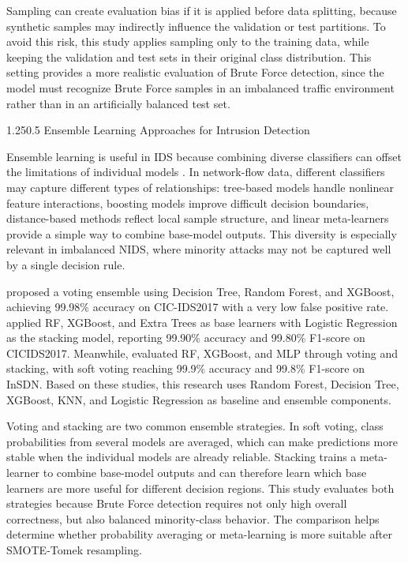 \documentclass[12pt,a4paper]{article}
\makeatletter
\renewcommand{\subsection}{\@startsection{subsection}{2}{0pt}%
  {1.25\baselineskip}{0.5\baselineskip}%
  {\normalfont\fontsize{13}{15.6}\selectfont\bfseries}}
\makeatother
\begin{document}
Sampling can create evaluation bias if it is applied before data splitting, because synthetic samples may indirectly influence the validation or test partitions. To avoid this risk, this study applies sampling only to the training data, while keeping the validation and test sets in their original class distribution. This setting provides a more realistic evaluation of Brute Force detection, since the model must recognize Brute Force samples in an imbalanced traffic environment rather than in an artificially balanced test set.


\subsection{Ensemble Learning Approaches for Intrusion Detection}

Ensemble learning is useful in IDS because combining diverse classifiers can offset the limitations of individual models \parencite{emanet2023voting,pramanick2025stacking,wardana2024collaborative,gu2025semisupervised,alsubaei2025smart}. In network-flow data, different classifiers may capture different types of relationships: tree-based models handle nonlinear feature interactions, boosting models improve difficult decision boundaries, distance-based methods reflect local sample structure, and linear meta-learners provide a simple way to combine base-model outputs. This diversity is especially relevant in imbalanced NIDS, where minority attacks may not be captured well by a single decision rule.

\textcite{farooqi2024enhancing} proposed a voting ensemble using Decision Tree, Random Forest, and XGBoost, achieving 99.98\% accuracy on CIC-IDS2017 with a very low false positive rate. \textcite{urmi2024stacked} applied RF, XGBoost, and Extra Trees as base learners with Logistic Regression as the stacking model, reporting 99.90\% accuracy and 99.80\% F1-score on CICIDS2017. Meanwhile, \textcite{alessa2024hybrid} evaluated RF, XGBoost, and MLP through voting and stacking, with soft voting reaching 99.9\% accuracy and 99.8\% F1-score on InSDN. Based on these studies, this research uses Random Forest, Decision Tree, XGBoost, KNN, and Logistic Regression as baseline and ensemble components.

Voting and stacking are two common ensemble strategies. In soft voting, class probabilities from several models are averaged, which can make predictions more stable when the individual models are already reliable. Stacking trains a meta-learner to combine base-model outputs and can therefore learn which base learners are more useful for different decision regions. This study evaluates both strategies because Brute Force detection requires not only high overall correctness, but also balanced minority-class behavior. The comparison helps determine whether probability averaging or meta-learning is more suitable after SMOTE-Tomek resampling.
\end{document}
